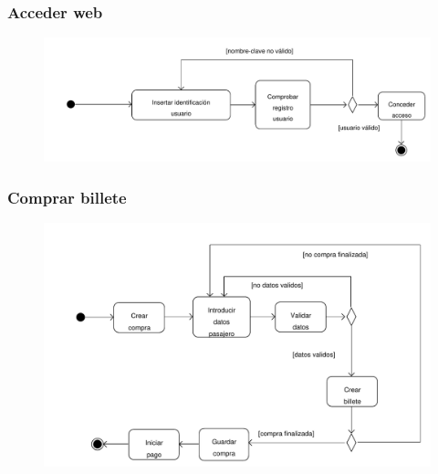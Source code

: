 \documentclass[11pt, a4paper, twoside, titlepage]{article}
\begin{document}
			\subsubsection{Acceder web}
				\begin{figure}[H]\centering
					\includegraphics[scale=.67]{diagramas/da_accederweb.pdf}
				\end{figure}

			\subsubsection{Comprar billete}
				\begin{figure}[H]\centering
					\includegraphics[scale=.72]{diagramas/da_comprarbillete.pdf}
				\end{figure}
\end{document}
